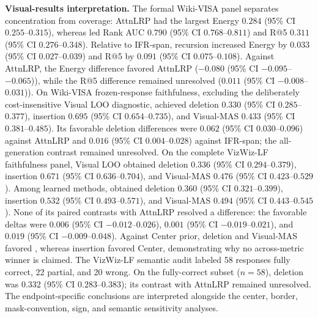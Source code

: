\noindent\textbf{Visual-results interpretation.}
The formal Wiki-VISA panel separates concentration from coverage: AttnLRP had the largest Energy $0.284$ (95\% CI $0.255$--$0.315$), whereas \flashtrace{} led Rank AUC $0.790$ (95\% CI $0.768$--$0.811$) and R@5 $0.311$ (95\% CI $0.276$--$0.348$). Relative to IFR-span, recursion increased Energy by $0.033$ (95\% CI $0.027$--$0.039$) and R@5 by $0.091$ (95\% CI $0.075$--$0.108$). Against AttnLRP, the Energy difference favored AttnLRP ($-0.080$ (95\% CI $-0.095$--$-0.065$)), while the R@5 difference remained unresolved ($0.011$ (95\% CI $-0.008$--$0.031$)).
On Wiki-VISA frozen-response faithfulness, excluding the deliberately cost-insensitive Visual LOO diagnostic, \flashtrace{} achieved deletion $0.330$ (95\% CI $0.285$--$0.377$), insertion $0.695$ (95\% CI $0.654$--$0.735$), and Visual-MAS $0.433$ (95\% CI $0.381$--$0.485$). Its favorable deletion differences were $0.062$ (95\% CI $0.030$--$0.096$) against AttnLRP and $0.016$ (95\% CI $0.004$--$0.028$) against IFR-span; the all-generation contrast remained unresolved.
On the complete VizWiz-LF faithfulness panel, Visual LOO obtained deletion $0.336$ (95\% CI $0.294$--$0.379$), insertion $0.671$ (95\% CI $0.636$--$0.704$), and Visual-MAS $0.476$ (95\% CI $0.423$--$0.529$). Among learned methods, \flashtrace{} obtained deletion $0.360$ (95\% CI $0.321$--$0.399$), insertion $0.532$ (95\% CI $0.493$--$0.571$), and Visual-MAS $0.494$ (95\% CI $0.443$--$0.545$). None of its paired contrasts with AttnLRP resolved a difference: the favorable deltas were $0.006$ (95\% CI $-0.012$--$0.026$), $0.001$ (95\% CI $-0.019$--$0.021$), and $0.019$ (95\% CI $-0.009$--$0.048$). Against Center prior, deletion and Visual-MAS favored \flashtrace{}, whereas insertion favored Center, demonstrating why no across-metric winner is claimed.
The VizWiz-LF semantic audit labeled 58 responses fully correct, 22 partial, and 20 wrong. On the fully-correct subset ($n=58$), \flashtrace{} deletion was $0.332$ (95\% CI $0.283$--$0.383$); its contrast with AttnLRP remained unresolved. The endpoint-specific conclusions are interpreted alongside the center, border, mask-convention, sign, and semantic sensitivity analyses.
